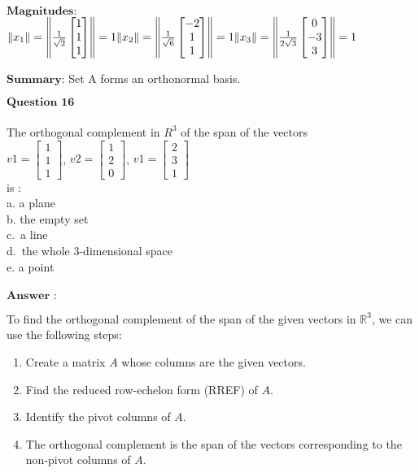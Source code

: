 \documentclass[11pt]{article}
\providecommand{\tightlist}{%
      \setlength{\itemsep}{0pt}\setlength{\parskip}{0pt}}
\begin{document}
$\textbf{Magnitudes:}$\\
$ \|x_1\| = \left\| \frac{1}{\sqrt{2}} \begin{bmatrix} 1 \\ 1 \\ 1 \end{bmatrix} \right\| = 1 \\ \|x_2\| = \left\| \frac{1}{\sqrt{6}} \begin{bmatrix} -2 \\ 1 \\ 1 \end{bmatrix} \right\| = 1 \\ \|x_3\| = \left\| \frac{1}{2\sqrt{3}} \begin{bmatrix} 0 \\ -3 \\ 3 \end{bmatrix} \right\| = 1 $

$\textbf{Summary:}$ Set A forms an orthonormal basis.

    $\textbf{Question 16}$\\
~\\
The orthogonal complement in $R^3$ of the span of the vectors\\
$v1=\begin{bmatrix} 1 \\ 1 \\ 1 \end{bmatrix}$,
$v2=\begin{bmatrix} 1 \\ 2 \\ 0 \end{bmatrix}$,
$v1=\begin{bmatrix} 2 \\ 3 \\ 1 \end{bmatrix}$\\
is :\\
a. a plane\\
b. the empty set\\
c.~a line\\
d.~the whole 3-dimensional space\\
e. a point\\
~\\
$\textbf{Answer :}$

    To find the orthogonal complement of the span of the given vectors in $
\mathbb{R}^3 $, we can use the following steps:

\begin{enumerate}
\def\labelenumi{\arabic{enumi}.}
\tightlist
\item
  Create a matrix $ A $ whose columns are the given vectors.
\item
  Find the reduced row-echelon form (RREF) of $ A $.
\item
  Identify the pivot columns of $ A $.
\item
  The orthogonal complement is the span of the vectors corresponding to
  the non-pivot columns of $ A $.
\end{enumerate}
\end{document}

